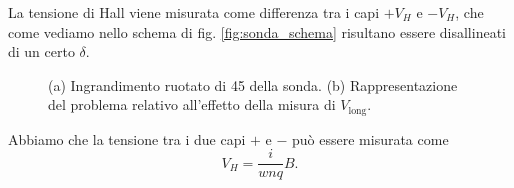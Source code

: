 \documentclass[fleqn,varvw]{memo}
\newcommand\vlong{V_\text{long}}
\begin{document}
La tensione di Hall viene misurata come differenza tra i capi $+V_H$ e $-V_H$, che come vediamo nello schema di fig. \ref{fig:sonda_schema} risultano essere disallineati di un certo $\delta$. 

\begin{figure}
    \centering
    \hspace{1cm}
    \subfloat[][]{\label{fig:sonda_schema}}
    \caption{(a) Ingrandimento ruotato di \SI{45}{\deg} della sonda. (b) Rappresentazione del problema relativo all'effetto della misura di $\vlong$.}
\end{figure}

Abbiamo che la tensione tra i due capi $+$ e $-$ può essere misurata come \begin{equation}
    V_H = \frac{i}{wnq}B. 
\end{equation} 
\end{document}
